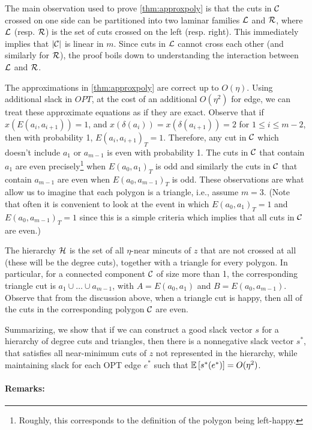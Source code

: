 The main observation used to prove \cref{thm:approxpoly} is that the cuts in ${\cal C}$ crossed on one side can be partitioned into two laminar families ${\cal L}$ and ${\mathcal{R}}$, where ${\cal L}$ (resp. ${\mathcal{R}}$) is the set of cuts crossed on the left (resp. right).
This immediately implies that $|{\cal C}|$ is linear in $m$. Since cuts in ${\cal L}$ cannot cross each other (and similarly for ${\mathcal{R}}$), the proof boils down to understanding the interaction between ${\cal L}$ and ${\mathcal{R}}$.

The approximations in \cref{thm:approxpoly} are correct up to $O(\eta)$. Using additional slack in $OPT$, at the cost of an additional $O(\eta^2)$ for edge, we can treat these  approximate equations as if they are exact. Observe that if $x(E(a_i, a_{i+1})) =1$, and $x(\delta(a_i))=x(\delta(a_{i+1}))=2$
for $1 \le i \le m-2$, then with probability 1, $E(a_i, a_{i+1})_T = 1$. Therefore, any cut in ${\cal C}$ which doesn't include $a_1$ or $a_{m-1}$ is even with probability 1. The  cuts in ${\cal C}$ that contain $a_1$ are even precisely\footnote{Roughly, this corresponds to the definition of the polygon being left-happy.} when $E(a_0, a_1)_T$ is odd and similarly the cuts in ${\cal C}$ that contain $a_{m-1}$ are even when $E(a_0, a_{m-1})_T$ is odd. These observations are what allow us to imagine that each polygon is a triangle, i.e., assume $m=3$. (Note that often it is convenient to look at the event in which $E(a_0, a_1)_T = 1$ and $E(a_0, a_{m-1})_T = 1$ since this is a simple criteria which implies that all cuts in ${\cal C}$ are even.)

The hierarchy $\mathcal{H}$ is the set of all $\eta$-near mincuts of $z$ that are not crossed at all (these will be the degree cuts), together with a triangle for every polygon. In particular, for a connected component ${\cal C}$ of size more than 1, the corresponding triangle cut is $a_1\cup \ldots \cup a_{m-1}$, with $A = E(a_0, a_1)$ and $B = E(a_0, a_{m-1})$. Observe that from the discussion above, when a triangle cut is happy, then all of the cuts in the corresponding polygon ${\cal C}$ are even.
 
 
 Summarizing, we show that if we can construct a good slack vector $s$ for a hierarchy of degree cuts and triangles, then there is a nonnegative slack vector $s^*$, that satisfies all near-minimum cuts of $z$ not represented in the hierarchy, while maintaining slack for each OPT edge $e^*$ such that ${\mathbb{E}}\left[s^*(e^*)\right] = O(\eta^2)$. 
 
 
 \paragraph{Remarks:}
 
